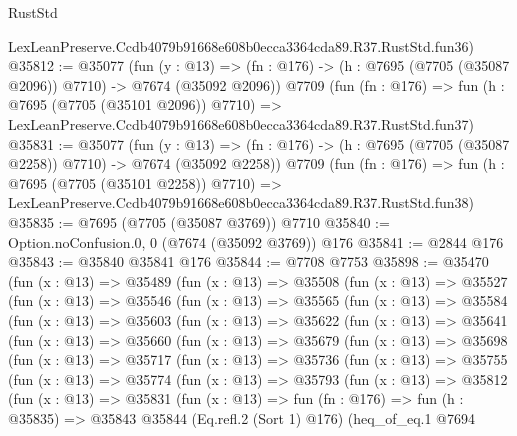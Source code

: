 \begin{lexlean}{RustStd}
\begin{coremodule}
    LexLeanPreserve.Ccdb4079b91668e608b0ecca3364cda89.R37.RustStd.fun36)
@35812 := @35077
    (fun (y : @13) =>
    (fn : @176) -> (h : @7695 (@7705 (@35087 @2096)) @7710) -> @7674 (@35092 @2096))
    @7709
    (fun (fn : @176) =>
    fun (h : @7695 (@7705 (@35101 @2096)) @7710) =>
    LexLeanPreserve.Ccdb4079b91668e608b0ecca3364cda89.R37.RustStd.fun37)
@35831 := @35077
    (fun (y : @13) =>
    (fn : @176) -> (h : @7695 (@7705 (@35087 @2258)) @7710) -> @7674 (@35092 @2258))
    @7709
    (fun (fn : @176) =>
    fun (h : @7695 (@7705 (@35101 @2258)) @7710) =>
    LexLeanPreserve.Ccdb4079b91668e608b0ecca3364cda89.R37.RustStd.fun38)
@35835 := @7695 (@7705 (@35087 @3769)) @7710
@35840 := Option.noConfusion.{0, 0} (@7674 (@35092 @3769)) @176
@35841 := @2844 @176
@35843 := @35840 @35841 @176
@35844 := @7708 @7753
@35898 := @35470
    (fun (x : @13) =>
    @35489
      (fun (x : @13) =>
      @35508
        (fun (x : @13) =>
        @35527
          (fun (x : @13) =>
          @35546
            (fun (x : @13) =>
            @35565
              (fun (x : @13) =>
              @35584
                (fun (x : @13) =>
                @35603
                  (fun (x : @13) =>
                  @35622
                    (fun (x : @13) =>
                    @35641
                      (fun (x : @13) =>
                      @35660
                        (fun (x : @13) =>
                        @35679
                          (fun (x : @13) =>
                          @35698
                            (fun (x : @13) =>
                            @35717
                              (fun (x : @13) =>
                              @35736
                                (fun (x : @13) =>
                                @35755
                                  (fun (x : @13) =>
                                  @35774
                                    (fun (x : @13) =>
                                    @35793
                                      (fun (x : @13) =>
                                      @35812
                                        (fun (x : @13) =>
                                        @35831
                                          (fun (x : @13) =>
                                          fun (fn : @176) =>
                                          fun (h : @35835) =>
                                          @35843
                                            @35844
                                            (Eq.refl.{2} (Sort 1) @176)
                                            (heq_of_eq.{1}
                                              @7694

\end{coremodule}
\end{lexlean}
